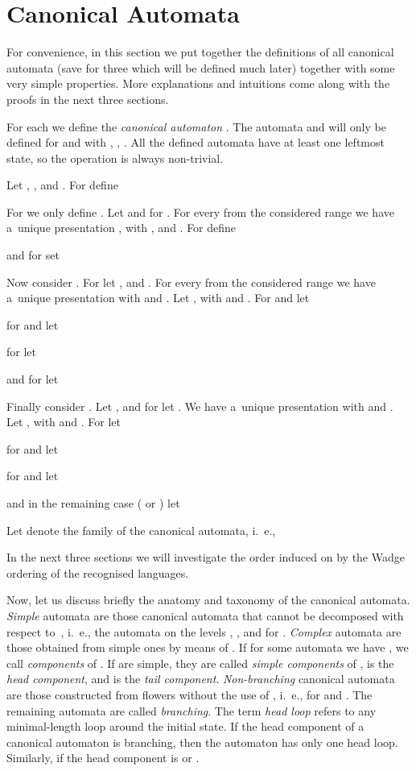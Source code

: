 \documentclass{LMCS}
\begin{document}
\section{Canonical Automata} \label{canonicalautomata}

For convenience, in this section we put together the definitions of all
canonical automata (save for three which will be defined much
later) together with some very simple properties. More explanations and
intuitions come along with the proofs in the next three 
sections. 

 For each  we define the {\em canonical automaton} . The automata  and  will only be defined for  and  with , ,  . All the defined automata have at least one leftmost state, so the operation  is always non-trivial. 

Let , , and . For  define 


For  we only define . Let  and  for . For every  from the considered range we have a~unique presentation , with ,  and . For  define

and for  set


Now consider . For  let ,  and .  For every  from the considered range we have a~unique presentation  with  and . Let , with  and .  For  and  let 

for   and  let

for  let 

and for  let 


Finally consider . Let , and for  let . We have a~unique presentation  with  and . Let , with  and . For  let 

for  and  let 

for  and  let

and in the remaining case ( or ) let



Let  denote the family of the canonical automata, i.~e.,
 
In the next three sections we will investigate the order induced on  by the Wadge ordering of the recognised languages. 

Now, let us discuss briefly the anatomy and taxonomy of the canonical automata. {\em Simple}  automata are those canonical automata that cannot be decomposed with respect to~,  i.~e., the automata on the levels , , and  for . {\em Complex}  automata are those obtained from simple ones by means of . If for some automata  we have  , we call  {\em components} of . If  are simple, they are called {\em simple components} of ,  is the {\em head component}, and  is the {\em tail component}.  {\em Non-branching} canonical automata are those constructed from flowers without the use of , i.~e.,  for  and . The remaining automata are called {\em branching}. The term {\em head loop} refers to any minimal-length loop around the initial state. If the head component of a canonical automaton is branching, then the automaton has only one head loop. Similarly, if the head component is  or .
\end{document}
